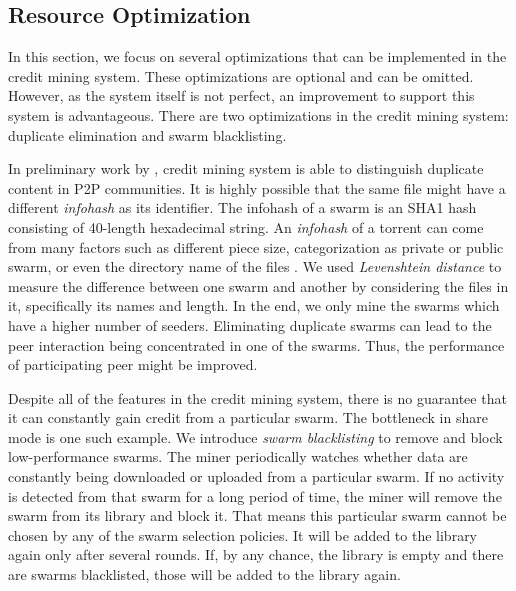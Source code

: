 \subsection{Resource Optimization}
\label{section:optimization}
In this section, we focus on several optimizations that can be implemented in the credit mining system. These optimizations are optional and can be omitted. However, as the system itself is not perfect, an improvement to support this system is advantageous. There are two optimizations in the credit mining system: duplicate elimination and swarm blacklisting.%

In preliminary work by \citeauthor{2015:creditmining:capota}, credit mining system is able to distinguish duplicate content in P2P communities. It is highly possible that the same file might have a different \textit{infohash} as its identifier. The infohash of a swarm is an SHA1 hash consisting of 40-length hexadecimal string. An \textit{infohash} of a torrent can come from many factors such as different piece size, categorization as private or public swarm, or even the directory name of the files \cite{2015:creditmining:capota}. We used \textit{Levenshtein distance} to measure the difference between one swarm and another by considering the files in it, specifically its names and length. In the end, we only mine the swarms which have a higher number of seeders. Eliminating duplicate swarms can lead to the peer interaction being concentrated in one of the swarms. Thus, the performance of participating peer might be improved.

Despite all of the features in the credit mining system, there is no guarantee that it can constantly gain credit from a particular swarm. The bottleneck in share mode is one such example. We introduce \textit{swarm blacklisting} to remove and block low-performance swarms. The miner periodically watches whether data are constantly being downloaded or uploaded from a particular swarm. If no activity is detected from that swarm for a long period of time, the miner will remove the swarm from its library and block it. That means this particular swarm cannot be chosen by any of the swarm selection policies. It will be added to the library again only after several rounds. If, by any chance, the library is empty and there are swarms blacklisted, those will be added to the library again.

